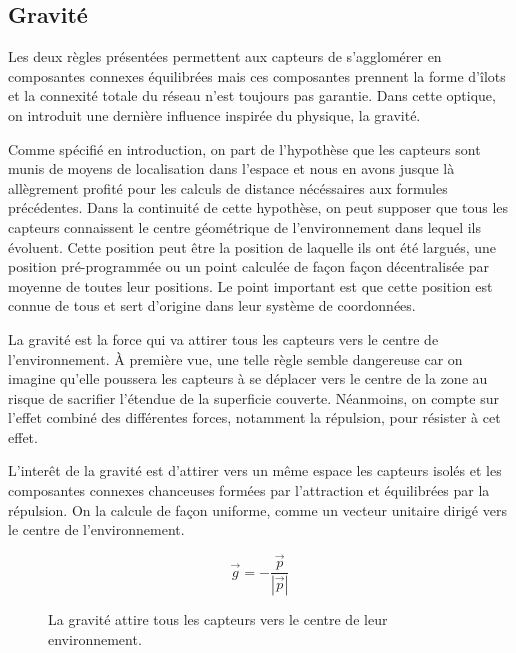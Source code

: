 \documentclass[10pt]{article}
\begin{document}
\begin{multicols}{2}
\subsection*{Gravité}

Les deux règles présentées permettent aux capteurs de s'agglomérer en
composantes connexes équilibrées mais ces composantes prennent la
forme d'îlots et la connexité totale du réseau n'est toujours pas
garantie. Dans cette optique, on introduit une dernière influence
inspirée du physique, la gravité.

Comme spécifié en introduction, on part de l'hypothèse que les
capteurs sont munis de moyens de localisation dans l'espace et nous en
avons jusque là allègrement profité pour les calculs de distance
nécéssaires aux formules précédentes. Dans la continuité de cette
hypothèse, on peut supposer que tous les capteurs connaissent le
centre géométrique de l'environnement dans lequel ils évoluent. Cette
position peut être la position de laquelle ils ont été largués, une
position pré-programmée ou un point calculée de façon façon
décentralisée par moyenne de toutes leur positions. Le point important
est que cette position est connue de tous et sert d'origine dans leur
système de coordonnées.

La gravité est la force qui va attirer tous les capteurs vers le
centre de l'environnement. \`A première vue, une telle règle semble
dangereuse car on imagine qu'elle poussera les capteurs à se déplacer
vers le centre de la zone au risque de sacrifier l'étendue de la
superficie couverte. Néanmoins, on compte sur l'effet combiné des
différentes forces, notamment la répulsion, pour résister à cet effet.

L'interêt de la gravité est d'attirer vers un même espace les capteurs
isolés et les composantes connexes chanceuses formées par l'attraction
et équilibrées par la répulsion. On la calcule de façon uniforme,
comme un vecteur unitaire dirigé vers le centre de l'environnement.

$$
\vec{g} = -\frac{\vec{p}}{|\vec{p}|}
$$

\begin{figure}[H]

  \centering

  

  \caption{La gravité attire tous les capteurs vers le centre de leur
    environnement.}
  \label{gravite}

\end{figure}


\end{multicols}
\end{document}
